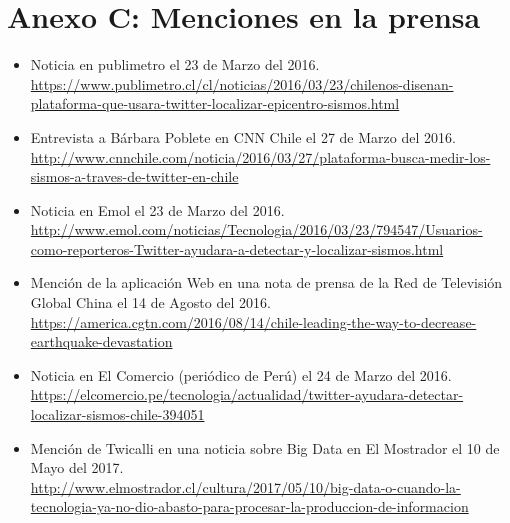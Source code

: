 \chapter*{Anexo C: Menciones en la prensa}
\label{anexo:prensa}

\begin{itemize}
\item Noticia en publimetro el 23 de Marzo del 2016. \\
{\tiny \url{https://www.publimetro.cl/cl/noticias/2016/03/23/chilenos-disenan-plataforma-que-usara-twitter-localizar-epicentro-sismos.html}}
\item Entrevista a Bárbara Poblete en CNN Chile el 27 de Marzo del 2016.\\ 
{\tiny \url{http://www.cnnchile.com/noticia/2016/03/27/plataforma-busca-medir-los-sismos-a-traves-de-twitter-en-chile}}
\item Noticia en Emol el 23 de Marzo del 2016.\\
{\tiny \url{http://www.emol.com/noticias/Tecnologia/2016/03/23/794547/Usuarios-como-reporteros-Twitter-ayudara-a-detectar-y-localizar-sismos.html}}
\item Mención de la aplicación Web en una nota de prensa de la Red de Televisión Global China el 14 de Agosto del 2016.\\
{\tiny \url{https://america.cgtn.com/2016/08/14/chile-leading-the-way-to-decrease-earthquake-devastation}}
\item Noticia en El Comercio (periódico de Perú) el 24 de Marzo del 2016.\\
{\tiny \url{https://elcomercio.pe/tecnologia/actualidad/twitter-ayudara-detectar-localizar-sismos-chile-394051}}
\item Mención de Twicalli en una noticia sobre Big Data en El Mostrador el 10 de Mayo del 2017.\\
{\tiny \url{http://www.elmostrador.cl/cultura/2017/05/10/big-data-o-cuando-la-tecnologia-ya-no-dio-abasto-para-procesar-la-produccion-de-informacion}}
\end{itemize}
